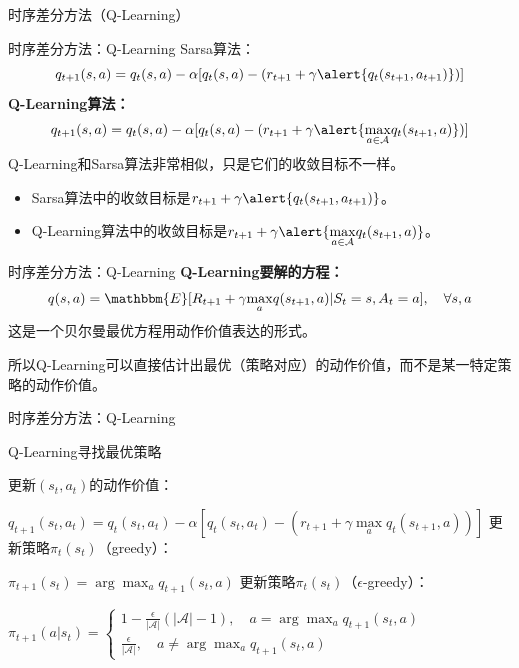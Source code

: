 \begin{section}{时序差分方法\alert{（Q-Learning）}}
\begin{frame}{时序差分方法：Q-Learning}
    Sarsa算法：
    \[
        q_{t+1}(s,a)=q_t(s,a)-\alpha[q_t(s,a)-(r_{t+1}+\gamma \alert{q_t(s_{t+1},a_{t+1})})]
    \]
    \textbf{Q-Learning算法：}
    \[
        q_{t+1}(s,a)=q_t(s,a)-\alpha[q_t(s,a)-(r_{t+1}+\gamma \alert{\underset{a\in\mathcal{A}}{\max}q_t(s_{t+1},a)})]
    \]
    Q-Learning和Sarsa算法非常相似，只是它们的收敛目标不一样。
    \begin{itemize}
        \item Sarsa算法中的收敛目标是$r_{t+1}+\gamma \alert{q_t(s_{t+1},a_{t+1})}$。
        \item Q-Learning算法中的收敛目标是$r_{t+1}+\gamma \alert{\underset{a\in\mathcal{A}}{\max}q_t(s_{t+1},a)}$。
    \end{itemize}
\end{frame}

\begin{frame}{时序差分方法：Q-Learning}
    \textbf{Q-Learning要解的方程：}
    \[
        q(s,a)=\mathbbm{E}[R_{t+1}+\gamma\underset{a}{\max}q(s_{t+1}, a)| S_t=s, A_t=a], \quad \forall s,a
    \]
    这是一个贝尔曼\alert{最优}方程用动作价值表达的形式。

    所以Q-Learning可以直接估计出\alert{最优（策略对应）的动作价值}，而不是某一特定策略的动作价值。
\end{frame}

\begin{frame}{时序差分方法：Q-Learning}
    \vspace{-0.2cm}
    \begin{block}{Q-Learning寻找最优策略}
        \begin{algorithmic}[1]
            \setlength{\baselineskip}{0.5\baselineskip}
                \State 更新$(s_t, a_t)$的动作价值：

                $
                    q_{t+1}(s_t,a_t)=q_t(s_t,a_t)-\alpha[q_t(s_t,a_t)-(r_{t+1}+\gamma \underset{a}{\max}q_t(s_{t+1},a))]
                $
                \State 更新策略$\pi_t(s_t)$（greedy）：

                $
                    \pi_{t+1}(s_t)=\arg\max_a q_{t+1}(s_t,a)
                $
                \State 更新策略$\pi_t(s_t)$（$\epsilon$-greedy）：
                
                $
                    \pi_{t+1}(a|s_{t})=\begin{cases}
                        1-\frac{\epsilon}{|\mathcal{A}|}(|\mathcal{A}|-1),\quad a=\arg\max_{a}q_{t+1}(s_t,a) \\
                        \frac{\epsilon}{|\mathcal{A}|},\quad a \neq \arg\max_{a}q_{t+1}(s_t,a)
                    \end{cases}
                $
            \EndFor
        \end{algorithmic}
    \end{block}
\end{frame}


\end{section}
